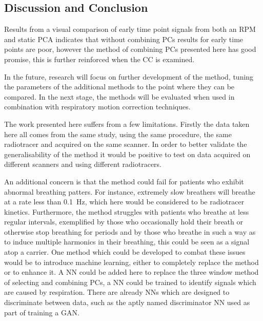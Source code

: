        \subsection{Discussion and Conclusion} \label{sec:pca_data_driven_surrogate_signal_extraction_methods_for_dynamic_pet_discussion_and_conclusion}
            Results from a visual comparison of early time point signals from both an \gls{RPM} and static \gls{PCA} indicates that without combining \glspl{PC} results for early time points are poor, however the method of combining \glspl{PC} presented here has good promise, this is further reinforced when the \gls{CC} is examined.
            
            In the future, research will focus on further development of the method, tuning the parameters of the additional methods to the point where they can be compared. In the next stage, the methods will be evaluated when used in combination with respiratory motion correction techniques.
            
            The work presented here suffers from a few limitations. Firstly the data taken here all comes from the same study, using the same procedure, the same radiotracer and acquired on the same scanner. In order to better validate the generalisability of the method it would be positive to test on data acquired on different scanners and using different radiotracers.
            
            An additional concern is that the method could fail for patients who exhibit abnormal breathing patters. For instance, extremely slow breathers will breathe at a rate less than \SI{0.1}{\hertz}, which here would be considered to be radiotracer kinetics. Furthermore, the method struggles with patients who breathe at less regular intervals, exemplified by those who occasionally hold their breath or otherwise stop breathing for periods and by those who breathe in such a way as to induce multiple harmonics in their breathing, this could be seen as a signal atop a carrier. One method which could be developed to combat these issues would be to introduce machine learning, either to completely replace the method or to enhance it. A \gls{NN} could be added here to replace the three window method of selecting and combining \glspl{PC}, a \gls{NN} could be trained to identify signals which are caused by respiration. There are already \glspl{NN} which are designed to discriminate between data, such as the aptly named discriminator \gls{NN} used as part of training a \gls{GAN}.
    
